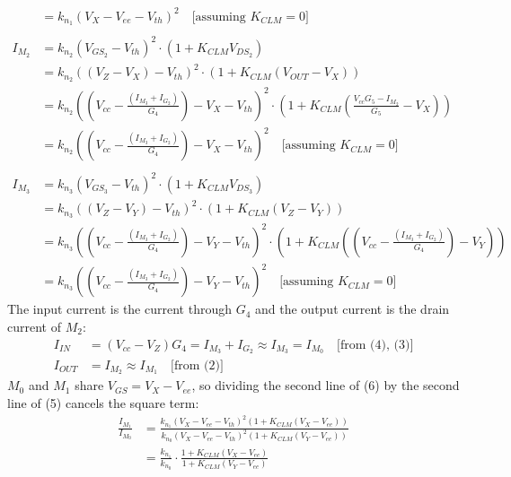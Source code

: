 \begin{enumerate}
\begin{align*}
              &= k_{n_1}(V_{X} - V_{ee} - V_{th})^2 \quad \text{[assuming } K_{CLM} = 0 \text{]} \tag{6} \\ \\
      I_{M_2} &= k_{n_2}(V_{GS_2} - V_{th})^2 \cdot (1 + K_{CLM} V_{DS_2}) \\
              &= k_{n_2}((V_{Z} - V_{X}) - V_{th})^2 \cdot (1 + K_{CLM} (V_{OUT} - V_{X})) \\
              &= k_{n_2}\left(\left(V_{cc} - \frac{(I_{M_3} + I_{G_2})}{G_4}\right) - V_{X} - V_{th}\right)^2 \cdot \left(1 + K_{CLM}\left(\frac{V_{cc}G_5 - I_{M_2}}{G_5} - V_{X}\right)\right) \\
              &= k_{n_2}\left(\left(V_{cc} - \frac{(I_{M_3} + I_{G_2})}{G_4}\right) - V_{X} - V_{th}\right)^2 \quad \text{[assuming } K_{CLM} = 0 \text{]} \tag{7} \\ \\
      I_{M_3} &= k_{n_3}(V_{GS_3} - V_{th})^2 \cdot (1 + K_{CLM} V_{DS_3}) \\
              &= k_{n_3}((V_{Z} - V_{Y}) - V_{th})^2 \cdot (1 + K_{CLM} (V_{Z} - V_{Y})) \\
              &= k_{n_3}\left(\left(V_{cc} - \frac{(I_{M_3} + I_{G_2})}{G_4}\right) - V_{Y} - V_{th}\right)^2 \cdot \left(1 + K_{CLM}\left(\left(V_{cc} - \frac{(I_{M_3} + I_{G_2})}{G_4}\right) - V_{Y}\right)\right) \\
              &= k_{n_3}\left(\left(V_{cc} - \frac{(I_{M_3} + I_{G_2})}{G_4}\right) - V_{Y} - V_{th}\right)^2 \quad \text{[assuming } K_{CLM} = 0 \text{]} \tag{8}
    \end{align*}
    The input current is the current through \(G_4\) and the output
    current is the drain current of \(M_2\):
    \begin{align*}
      I_{IN} &= (V_{cc} - V_Z)G_4 = I_{M_3} + I_{G_2} \approx I_{M_3} = I_{M_0} \quad \text{[from (4), (3)]} \\
      I_{OUT} &= I_{M_2} \approx I_{M_1} \quad \text{[from (2)]}
    \end{align*}
    \(M_0\) and \(M_1\) share \(V_{GS} = V_X - V_{ee}\), so dividing the
    second line of (6) by the second line of (5) cancels the square term:
    \begin{align*}
      \frac{I_{M_1}}{I_{M_0}} &= \frac{k_{n_1}(V_{X} - V_{ee} - V_{th})^2 (1 + K_{CLM} (V_{X} - V_{ee}))}{k_{n_0}(V_{X} - V_{ee} - V_{th})^2 (1 + K_{CLM} (V_{Y} - V_{ee}))} \\
                              &= \frac{k_{n_1}}{k_{n_0}} \cdot \frac{1 + K_{CLM} (V_{X} - V_{ee})}{1 + K_{CLM} (V_{Y} - V_{ee})} \\

\end{align*}
\end{enumerate}
